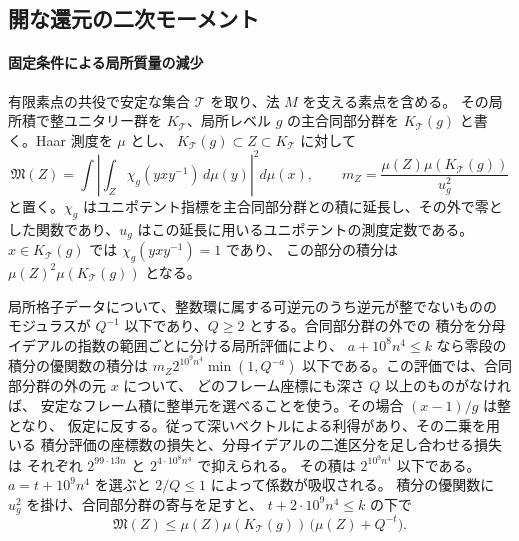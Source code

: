 \subsection{開な還元の二次モーメント}\label{sec:span-open-proof}

\paragraph{固定条件による局所質量の減少}
有限素点の共役で安定な集合 \(\mathcal T\) を取り、法 \(M\) を支える素点を含める。
その局所積で整ユニタリー群を \(K_{\mathcal T}\)、局所レベル \(g\) の主合同部分群を
\(K_{\mathcal T}(g)\) と書く。Haar 測度を \(\mu\) とし、
\(K_{\mathcal T}(g)\subset Z\subset K_{\mathcal T}\) に対して
\[
 \mathfrak M(Z)=\int
    \left|\int_Z \chi_g(yxy^{-1})\,d\mu(y)\right|^2d\mu(x),
 \qquad
 m_Z=\frac{\mu(Z)\mu(K_{\mathcal T}(g))}{u_g^2}
\]
と置く。\(\chi_g\) はユニポテント指標を主合同部分群との積に延長し、その外で零と
した関数であり、\(u_g\) はこの延長に用いるユニポテントの測度定数である。
\(x\in K_{\mathcal T}(g)\) では \(\chi_g(yxy^{-1})=1\) であり、
この部分の積分は \(\mu(Z)^2\mu(K_{\mathcal T}(g))\) となる。

局所格子データについて、整数環に属する可逆元のうち逆元が整でないものの
モジュラスが \(Q^{-1}\) 以下であり、\(Q\ge2\) とする。合同部分群の外での
積分を分母イデアルの指数の範囲ごとに分ける局所評価により、
\(a+10^8n^4\le k\) なら零段の積分の優関数の積分は
\(m_Z2^{10^9n^4}\min(1,Q^{-a})\) 以下である。この評価では、合同部分群の外の元 \(x\) について、
どのフレーム座標にも深さ \(Q\) 以上のものがなければ、
安定なフレーム積に整単元を選べることを使う。その場合 \((x-1)/g\) は整となり、
仮定に反する。従って深いベクトルによる利得があり、その二乗を用いる
積分評価の座標数の損失と、分母イデアルの二進区分を足し合わせる損失は
それぞれ \(2^{99\cdot13n}\) と \(2^{4\cdot10^8n^4}\) で抑えられる。
その積は \(2^{10^9n^4}\) 以下である。
\(a=t+10^9n^4\) を選ぶと \(2/Q\le1\) によって係数が吸収される。
積分の優関数に \(u_g^2\) を掛け、合同部分群の寄与を足すと、
\(t+2\cdot10^9n^4\le k\) の下で
\begin{equation}\label{eq:span-local-mass}
 \mathfrak M(Z)
 \le\mu(Z)\mu(K_{\mathcal T}(g))\,\bigl(\mu(Z)+Q^{-t}\bigr).
\end{equation}

